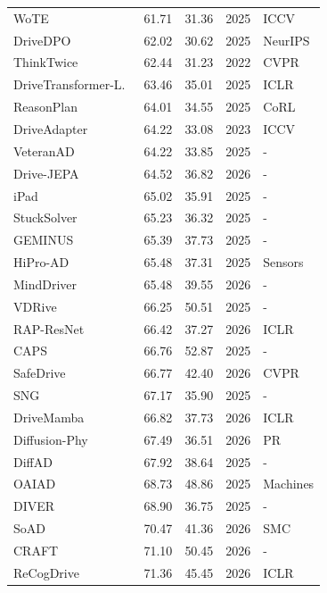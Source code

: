 \documentclass[10pt,twocolumn,letterpaper]{article}
\begin{document}
\begin{table}[t]
\begin{tabular}{l|ll|ll}
WoTE~\cite{Li2025ICCV} & 61.71 & 31.36 & 2025 & ICCV \\
DriveDPO~\cite{Shang2025NEURIPS} & 62.02 & 30.62 & 2025 & NeurIPS \\
ThinkTwice~\cite{Jia2023CVPR} & 62.44 & 31.23 & 2022 & CVPR \\
DriveTransformer-L.~\cite{Jia2025ICLR} & 63.46 & 35.01 & 2025 & ICLR \\
ReasonPlan~\cite{Liu2025CoRL} & 64.01 & 34.55 & 2025 & CoRL \\
DriveAdapter~\cite{Jia2023ICCV} & 64.22 & 33.08 & 2023 & ICCV \\
VeteranAD~\cite{Zhang2025ARXIVb} & 64.22 & 33.85 & 2025 & - \\
Drive-JEPA~\cite{Wang2026ARXIV} & 64.52 & 36.82 & 2026 & - \\
iPad~\cite{Guo2025ARXIVb} & 65.02 & 35.91 & 2025 & - \\
StuckSolver~\cite{Bao2025ARXIV} & 65.23 & 36.32 & 2025 & - \\
GEMINUS~\cite{Wan2025ARXIV} & 65.39 & 37.73 & 2025 & - \\
HiPro-AD~\cite{Chen2025SENSORS} & 65.48 & 37.31 & 2025 & Sensors \\
MindDriver~\cite{Zhang2026ARXIV} & 65.48 & 39.55 & 2026 & - \\
VDRive~\cite{Guo2025ARXIV} & 66.25 & 50.51 & 2025 & - \\
RAP-ResNet~\cite{Feng2026ICLR} & 66.42 & 37.27 & 2026 & ICLR \\
CAPS~\cite{Mirkhani2025ARXIV} & 66.76 & 52.87 & 2025 & - \\
SafeDrive~\cite{Kim2026CVPR} & 66.77 & 42.40 & 2026 & CVPR \\
SNG~\cite{Hua2025Online} & 67.17 & 35.90 & 2025 & - \\
DriveMamba~\cite{Su2026ICLR} & 66.82 & 37.73 & 2026 & ICLR \\
Diffusion-Phy~\cite{Hu2026PR} & 67.49 & 36.51 & 2026 & PR \\
DiffAD~\cite{Wang2025ARXIVb} & 67.92 & 38.64 & 2025 & - \\
OAIAD~\cite{Yin2025Machines} & 68.73 & 48.86 & 2025 & Machines \\
DIVER~\cite{Song2025ARXIV} & 68.90 & 36.75 & 2025 & - \\ 
SoAD~\cite{Gao2026SMC} & 70.47 & 41.36 & 2026 & SMC \\
CRAFT~\cite{Chen2026ARXIV} & 71.10 & 50.45 & 2026 & - \\
ReCogDrive~\cite{Li2026ICLR} & 71.36 & 45.45 & 2026 & ICLR \\

\end{tabular}
\end{table}
\end{document}
